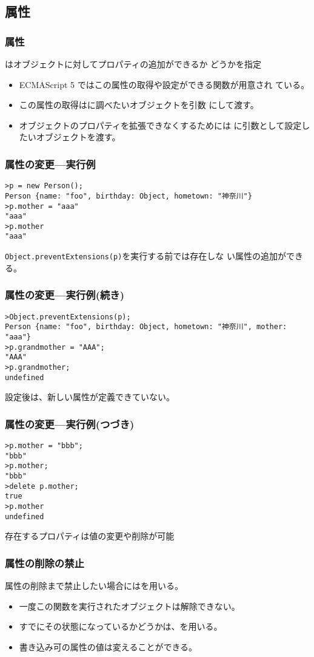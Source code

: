  \subsection{\protect{}属性}
 \begin{frame}[containsverbatim]
  \frametitle{\protect{}属性}
はオブジェクトに対してプロパティの追加ができるか
  どうかを指定
 \begin{itemize}
    \item ECMAScript 5 ではこの属性の取得や設定ができる関数が用意され
ている。
   \item この属性の取得はに調べたいオブジェクトを引数
にして渡す。
   \item オブジェクトのプロパティを拡張できなくするためには
に引数として設定したいオブジェクトを渡す。
  \end{itemize}
 \end{frame}
\begin{frame}[containsverbatim]
 \frametitle{\protect{}属性の変更---実行例}
\begin{Verbatim}
>p = new Person();
Person {name: "foo", birthday: Object, hometown: "神奈川"}
>p.mother = "aaa"
"aaa"
>p.mother
"aaa"
\end{Verbatim}
\texttt{Object.preventExtensions(p)}を実行する前では存在しな
 い属性の追加ができる。
 \end{frame}
\begin{frame}[containsverbatim]
 \frametitle{\protect{}属性の変更---実行例(続き)}
\begin{Verbatim}
>Object.preventExtensions(p);
Person {name: "foo", birthday: Object, hometown: "神奈川", mother: "aaa"}
>p.grandmother = "AAA";
"AAA"
>p.grandmother;
undefined
\end{Verbatim}
 設定後は、新しい属性が定義できていない。
 \end{frame}
\begin{frame}[containsverbatim]
\frametitle{\protect{}属性の変更---実行例(つづき)}
\begin{Verbatim}
>p.mother = "bbb";
"bbb"
>p.mother;
"bbb"
>delete p.mother;
true
>p.mother
undefined
\end{Verbatim}
存在するプロパティは値の変更や削除が可能
 \end{frame}
\begin{frame}[containsverbatim]
 \frametitle{属性の削除の禁止}
 属性の削除まで禁止したい場合にはを用いる。
 \begin{itemize}
  \item 一度この関数を実行されたオブジェクトは解除できない。
  \item すでにその状態になっているかどうかは、を用いる。
  \item 書き込み可の属性の値は変えることができる。
 \end{itemize}
 \end{frame}
